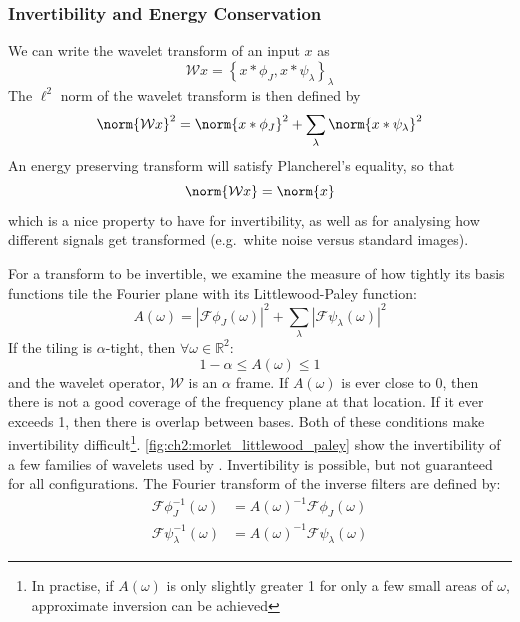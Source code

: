 \subsubsection{Invertibility and Energy Conservation}
  We can write the wavelet transform of an input $x$ as 
  \begin{equation}
    \mathcal{W}x = \left\{x \ast \phi_J, x \ast \psi_{\lambda}
    \right\}_{\lambda}
  \end{equation}
  The $\ell^2$ norm of the wavelet transform is then defined by
  \begin{equation}
    \norm{\mathcal{W}x}^2 = \norm{x\ast\phi_J}^2 + \sum_{\lambda}\norm{x \ast
      \psi_\lambda}^2
  \end{equation}
  An energy preserving transform will satisfy Plancherel's equality, so that
  \begin{equation}
    \norm{\mathcal{W}x} = \norm{x}
  \end{equation}
  which is a nice property to have for invertibility, as well as for analysing
  how different signals get transformed (e.g.\ white noise versus standard
  images).
  
  For a transform to be invertible, we examine the measure of how tightly its
  basis functions tile the Fourier plane with its Littlewood-Paley function:  
  \begin{equation}
    A(\omega) = {|\mathcal{F}\phi_J(\omega)|}^2
    + \sum_{\lambda} {|\mathcal{F}\psi_{\lambda}(\omega)|}^2
  \end{equation}
  If the tiling is $\alpha$-tight, then $\forall \omega \in \mathbb{R}^2$:
  \begin{equation}
    1-\alpha \le A(\omega) \le 1
  \end{equation}
  and the wavelet operator, $\mathcal{W}$ is an $\alpha$ frame. If $A(\omega)$
  is ever close to 0, then there is not a good coverage of the frequency plane
  at that location. If it ever exceeds 1, then there is overlap between bases.
  Both of these conditions make invertibility difficult\footnote{In practise,
  if $A(\omega)$ is only slightly greater 1 for only a few small areas of
  $\omega$, approximate inversion can be achieved}.
  \autoref{fig:ch2:morlet_littlewood_paley} show the invertibility of a few
  families of wavelets used by \Mallat. Invertibility is possible, but not
  guaranteed for all configurations. The Fourier transform of the inverse
  filters are defined by:
  \begin{align}
    \mathcal{F}\phi_J^{-1}(\omega) &= A(\omega)^{-1} \mathcal{F}\phi_J(\omega) \\
    \mathcal{F}\psi_{\lambda}^{-1}(\omega) &= A(\omega)^{-1}
      \mathcal{F}\psi_{\lambda}(\omega) 
  \end{align}

